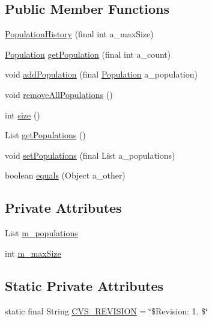 \subsection*{Public Member Functions}
\begin{DoxyCompactItemize}
\item 
\hyperlink{classorg_1_1jgap_1_1eval_1_1_population_history_aa162e16d4c3228185dcc1af697524dfa}{Population\-History} (final int a\-\_\-max\-Size)
\item 
\hyperlink{classorg_1_1jgap_1_1_population}{Population} \hyperlink{classorg_1_1jgap_1_1eval_1_1_population_history_a932b7a47213b0227479d2000d02c8b9f}{get\-Population} (final int a\-\_\-count)
\item 
void \hyperlink{classorg_1_1jgap_1_1eval_1_1_population_history_ad7ef5e337b6e4397fd23eb3012107ab2}{add\-Population} (final \hyperlink{classorg_1_1jgap_1_1_population}{Population} a\-\_\-population)
\item 
void \hyperlink{classorg_1_1jgap_1_1eval_1_1_population_history_a4ba2b8071fd15d2b668c49c3bb85c60a}{remove\-All\-Populations} ()
\item 
int \hyperlink{classorg_1_1jgap_1_1eval_1_1_population_history_a57080391ee0debfd8b2cfbce7655c53f}{size} ()
\item 
List \hyperlink{classorg_1_1jgap_1_1eval_1_1_population_history_a5fe6c2f7a290bba865a44ec6101ba16b}{get\-Populations} ()
\item 
void \hyperlink{classorg_1_1jgap_1_1eval_1_1_population_history_a1205df8f5621ddbd279fd0ecf2f14bf4}{set\-Populations} (final List a\-\_\-populations)
\item 
boolean \hyperlink{classorg_1_1jgap_1_1eval_1_1_population_history_a555bbe2c2cdb7c59c239688b02c3fdb0}{equals} (Object a\-\_\-other)
\end{DoxyCompactItemize}
\subsection*{Private Attributes}
\begin{DoxyCompactItemize}
\item 
List \hyperlink{classorg_1_1jgap_1_1eval_1_1_population_history_a90f9a490e2c080d72cedaf3fdb06f402}{m\-\_\-populations}
\item 
int \hyperlink{classorg_1_1jgap_1_1eval_1_1_population_history_a5474fc1e289606b95c8d895ca41b3c7d}{m\-\_\-max\-Size}
\end{DoxyCompactItemize}
\subsection*{Static Private Attributes}
\begin{DoxyCompactItemize}
\item 
static final String \hyperlink{classorg_1_1jgap_1_1eval_1_1_population_history_a90a02384916744cab78435afc457a9fa}{C\-V\-S\-\_\-\-R\-E\-V\-I\-S\-I\-O\-N} = \char`\"{}\$Revision\-: 1. \$\char`\"{}
\end{DoxyCompactItemize}


